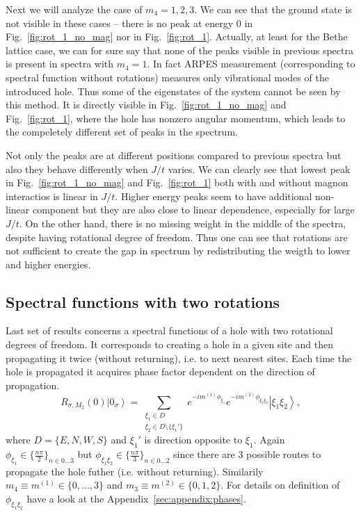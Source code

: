 \documentclass[%
 reprint,
 amsmath,amssymb,
 aps,
prb,
floatfix,
]{revtex4-1}
\newcommand{\ket}[1]{\left\vert #1 \right\rangle}
\begin{document}
Next we will analyze the case of $m_4 = 1,2,3$. We can see that the ground state is not visible in these cases -- there is no peak at energy 0 in Fig.~\ref{fig:rot_1_no_mag} nor in Fig.~\ref{fig:rot_1}. Actually, at least for the Bethe lattice case, we can for sure say that none of the peaks visible in previous spectra is present in spectra with $m_4 = 1$. In fact ARPES measurement (corresponding to spectral function without rotations) measures only vibrational modes of the introduced hole. Thus some of the eigenstates of the system cannot be seen by this method. It is directly visible in Fig.~\ref{fig:rot_1_no_mag} and Fig.~\ref{fig:rot_1}, where the hole has nonzero angular momentum, which leads to the compeletely different set of peaks in the spectrum.

Not only the peaks are at different positions compared to previous spectra but also they behave differently when $J/t$ varies. We can clearly see that lowest peak in Fig.~\ref{fig:rot_1_no_mag} and Fig.~\ref{fig:rot_1} both with and without magnon interactios is linear in $J/t$. Higher energy peaks seem to have additional non-linear component but they are also close to linear dependence, especially for large $J/t$. On the other hand, there is no missing weight in the middle of the spectra, despite having rotational degree of freedom. Thus one can see that rotations are not sufficient to create the gap in spectrum by redistributing the weigth to lower and higher energies.

\subsection{\label{sec:results:two_rot}Spectral functions with two rotations}

Last set of results concerns a spectral functions of a hole with two rotational degrees of freedom. It corresponds to creating a hole in a given site and then propagating it twice (without returning), i.e. to next nearest sites. Each time the hole is propagated it acquires phase factor dependent on the direction of propagation.
\begin{equation}
	R_{\sigma,M_2}(0) \ket{0_\sigma} = \sum_{\substack{\xi_1 \in D \\ \xi_2 \in D\setminus\{\xi_1'\}}} e^{-i m^{(1)} \phi_{\xi_1}} e^{-i m^{(2)} \phi_{\xi_1 \xi_2}} \ket{\xi_1 \xi_2},
\end{equation}
where $D = \{E,N,W,S\}$ and $\xi_1'$ is direction opposite to $\xi_1$. Again $\phi_{\xi_1} \in \{\frac{n\pi}{2}\}_{n\in0...3}$ but $\phi_{\xi_1 \xi_2} \in \{\frac{n\pi}{3}\}_{n\in0...2}$ since there are 3 possible routes to propagate the hole futher (i.e. without returning). Similarily $m_4 \equiv m^{(1)} \in \{0,...,3\}$ and $m_3 \equiv m^{(2)} \in \{0,1,2\}$. For details on definition of $\phi_{\xi_1 \xi_2}$ have a look at the Appendix~\ref{sec:appendix:phases}. 
\end{document}
